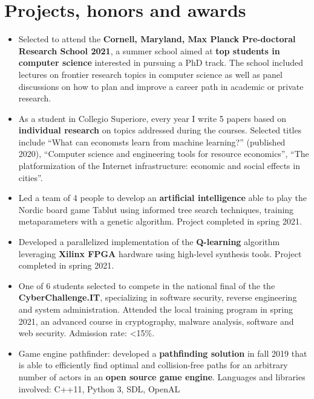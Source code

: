 \documentclass[10pt, a4paper]{extarticle}
\begin{document}
\section*{Projects, honors and awards}
\begin{itemize}
  \item Selected to attend the \textbf{Cornell, Maryland, Max Planck Pre-doctoral Research School 2021}, a summer school aimed at \textbf{top students in computer science} interested in pursuing a PhD track.
    The school included lectures on frontier research topics in computer science as well as panel discussions on how to plan and improve a career path in academic or private research.
  \item As a student in Collegio Superiore, every year I write 5 papers based on \textbf{individual research} on topics addressed during the courses.
    Selected titles include ``What can economsts learn from machine learning?'' (published 2020), ``Computer science and engineering tools for resource economics'', ``The platformization of the Internet infrastructure: economic and social effects in cities''.
  \item Led a team of 4 people to develop an \textbf{artificial intelligence} able to play the Nordic board game Tablut using informed tree search techniques, training metaparameters with a genetic algorithm.
    Project completed in spring 2021.
  \item Developed a parallelized implementation of the \textbf{Q-learning} algorithm leveraging \textbf{Xilinx FPGA} hardware using high-level synthesis tools.
    Project completed in spring 2021.
  \item One of 6 students selected to compete in the national final of the the \textbf{CyberChallenge.IT}, specializing in software security, reverse engineering and system administration.
    Attended the local training program in spring 2021, an advanced course in cryptography, malware analysis, software and web security.
    Admission rate: <15\%.
  \item Game engine pathfinder: developed a \textbf{pathfinding solution} in fall 2019 that is able to efficiently find optimal and collision-free paths for an arbitrary number of actors in an \textbf{open source game engine}.
    Languages and libraries involved: C++11, Python 3, SDL, OpenAL

\end{itemize}
\end{document}
